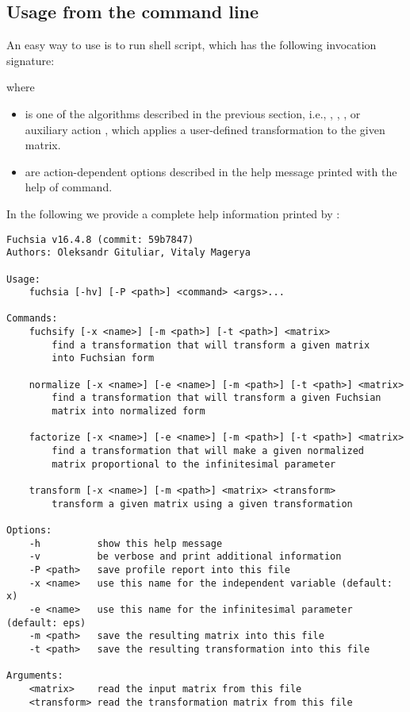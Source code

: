 \documentclass[12pt,a4paper]{article}
\begin{document}
\subsection{Usage from the command line}

An easy way to use \fuchsia is to run  shell script, which has the following invocation signature:


where
\begin{itemize}
  \item {} is one of the algorithms described in the previous section, i.e., , , , or auxiliary action , which applies a user-defined transformation to the given matrix.
  \item {} are action-dependent options described in the help message printed with the help of  command.
\end{itemize}

In the following we provide a complete help information printed by :
{\small
\begin{verbatim}
Fuchsia v16.4.8 (commit: 59b7847)
Authors: Oleksandr Gituliar, Vitaly Magerya
        
Usage:
    fuchsia [-hv] [-P <path>] <command> <args>...

Commands:
    fuchsify [-x <name>] [-m <path>] [-t <path>] <matrix>
        find a transformation that will transform a given matrix
        into Fuchsian form

    normalize [-x <name>] [-e <name>] [-m <path>] [-t <path>] <matrix>
        find a transformation that will transform a given Fuchsian
        matrix into normalized form

    factorize [-x <name>] [-e <name>] [-m <path>] [-t <path>] <matrix>
        find a transformation that will make a given normalized
        matrix proportional to the infinitesimal parameter

    transform [-x <name>] [-m <path>] <matrix> <transform>
        transform a given matrix using a given transformation

Options:
    -h          show this help message
    -v          be verbose and print additional information
    -P <path>   save profile report into this file
    -x <name>   use this name for the independent variable (default: x)
    -e <name>   use this name for the infinitesimal parameter (default: eps)
    -m <path>   save the resulting matrix into this file
    -t <path>   save the resulting transformation into this file

Arguments:
    <matrix>    read the input matrix from this file
    <transform> read the transformation matrix from this file
\end{verbatim}}
\end{document}
